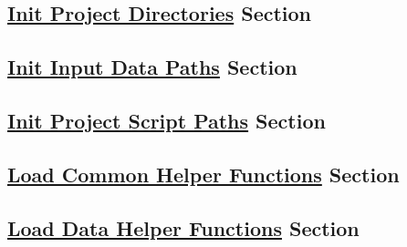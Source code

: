 \documentclass[
]{report}
\begin{document}
\hfill\break

\subsection{\texorpdfstring{\href{https://github.com/AzKurban-edX-DS/edx.capstone.choose-your-own/blob/main/r/support-scripts/setup.R\#L178-L425}{Init Project Directories} Section}{Init Project Directories Section}}\label{init-project-directories-section}

\hfill\break

\subsection{\texorpdfstring{\href{https://github.com/AzKurban-edX-DS/edx.capstone.choose-your-own/blob/main/r/support-scripts/setup.R\#L426-L444}{Init Input Data Paths} Section}{Init Input Data Paths Section}}\label{init-input-data-paths-section}

\hfill\break

\subsection{\texorpdfstring{\href{https://github.com/AzKurban-edX-DS/edx.capstone.choose-your-own/blob/main/r/support-scripts/setup.R\#L445-L547}{Init Project Script Paths} Section}{Init Project Script Paths Section}}\label{init-project-script-paths-section}

\hfill\break

\subsection{\texorpdfstring{\href{https://github.com/AzKurban-edX-DS/edx.capstone.choose-your-own/blob/main/r/support-scripts/setup.R\#L548-L557}{Load Common Helper Functions} Section}{Load Common Helper Functions Section}}\label{load-common-helper-functions-section}

\hfill\break

\subsection{\texorpdfstring{\href{https://github.com/AzKurban-edX-DS/edx.capstone.choose-your-own/blob/main/r/support-scripts/setup.R\#L558-L569}{Load Data Helper Functions} Section}{Load Data Helper Functions Section}}\label{load-data-helper-functions-section}

\hfill\break
\end{document}
